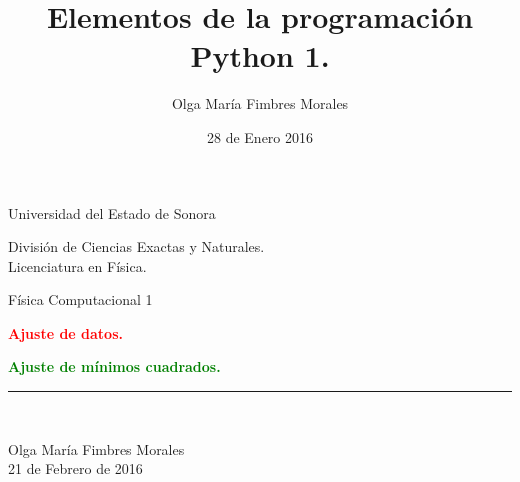 \documentclass[12pt]{article}
\title{Elementos de la programación Python 1.}
\author{\textcolor{JungleGreen}{Olga María Fimbres Morales}}
\date{28 de Enero 2016}
\begin{document}
\begin{titlepage}

\begin{center}
\begin{large}
Universidad del Estado de Sonora\\
\end{large}
\vspace*{0.15in}
División de Ciencias Exactas y Naturales.\\
\vspace*{0.15in}
Licenciatura en Física. \\
\vspace*{0.6in}
\begin{large}
Física Computacional 1\\
\end{large}
\vspace*{0.2in}
\begin{Large}
\textbf{{\textcolor{Red}{Ajuste de datos.}}} \\
\end{Large}
\vspace*{0.3in}
\begin{large}
\textbf{{\textcolor{Green}{Ajuste de mínimos cuadrados.}}} \\
\end{large}

\rule{80mm}{0.1mm}\\
\vspace*{0.1in}
\begin{large}
{\textcolor{JungleGreen}{Olga María Fimbres Morales}}\\
21 de Febrero de 2016\\
\end{large}
\end{center}
\end{titlepage}

\pagebreak
\end{document}

